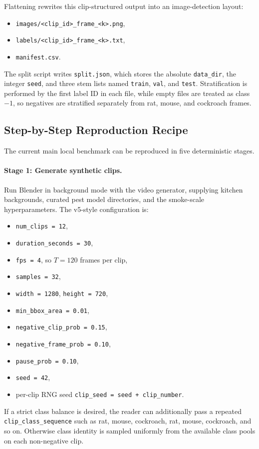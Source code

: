 \documentclass[11pt]{article}
\begin{document}
Flattening rewrites this clip-structured output into an image-detection layout:
\begin{itemize}[leftmargin=1.5em]
    \item \texttt{images/<clip\_id>\_frame\_<k>.png},
    \item \texttt{labels/<clip\_id>\_frame\_<k>.txt},
    \item \texttt{manifest.csv}.
\end{itemize}
The split script writes \texttt{split.json}, which stores the absolute \texttt{data\_dir}, the integer \texttt{seed}, and three stem lists named \texttt{train}, \texttt{val}, and \texttt{test}. Stratification is performed by the first label ID in each file, while empty files are treated as class $-1$, so negatives are stratified separately from rat, mouse, and cockroach frames.

\subsection{Step-by-Step Reproduction Recipe}
The current main local benchmark can be reproduced in five deterministic stages.

\paragraph{Stage 1: Generate synthetic clips.}
Run Blender in background mode with the video generator, supplying kitchen backgrounds, curated pest model directories, and the smoke-scale hyperparameters. The v5-style configuration is:
\begin{itemize}[leftmargin=1.5em]
    \item \texttt{num\_clips = 12},
    \item \texttt{duration\_seconds = 30},
    \item \texttt{fps = 4}, so $T = 120$ frames per clip,
    \item \texttt{samples = 32},
    \item \texttt{width = 1280}, \texttt{height = 720},
    \item \texttt{min\_bbox\_area = 0.01},
    \item \texttt{negative\_clip\_prob = 0.15},
    \item \texttt{negative\_frame\_prob = 0.10},
    \item \texttt{pause\_prob = 0.10},
    \item \texttt{seed = 42},
    \item per-clip RNG seed \texttt{clip\_seed = seed + clip\_number}.
\end{itemize}
If a strict class balance is desired, the reader can additionally pass a repeated \texttt{clip\_class\_sequence} such as rat, mouse, cockroach, rat, mouse, cockroach, and so on. Otherwise class identity is sampled uniformly from the available class pools on each non-negative clip.
\end{document}
